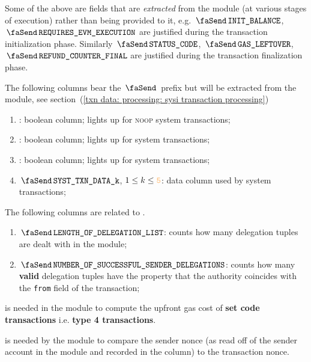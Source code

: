 \saNote{}
Some of the above are fields that are \emph{extracted} from the \hubMod{} module (at various stages of execution) rather than being provided to it, e.g.
$\txInitialBalance$,
$\txRequiresEvmExecution$
are justified during the transaction initialization phase.
Similarly
$\txStatusCode$,
$\txLeftoverGas$,
$\txFinalRefundCounter$
are justified during the transaction finalization phase.

The following columns bear the $\transactionSignifier$ prefix but will be extracted from the
\systTxnDataMod{} module,
see section~(\ref{txn data: processing: sysi transaction processing})
\begin{enumerate}[resume]
	\item
		\godGiven{}
		\txnSystemTransactionNoop:
		boolean column;
		lights up for \textsc{noop} system transactions;
	\item
		\godGiven{}
		\txnSystemTransactionEipBeaconRoot:
		boolean column;
		lights up for \cite{EIP-4788} system transactions;
	\item
		\godGiven{}
		\txnSystemTransactionEipBlockHash:
		boolean column;
		lights up for \cite{EIP-2935} system transactions;
	\item
		\godGiven{}
		$\txnSystemTransactionDataCol{k}$, $1 \leq k \leq \txnDataHubNumberOfDataColumns$:
		data column used by system transactions;
\end{enumerate}
The following columns are related to \cite{EIP-7702}.
\begin{enumerate}[resume]
	\item
		\markAsJustifiedHere{}
		$\txLengthOfDelegationList$:
		counts how many delegation tuples are dealt with in the \hubMod{} module;
	\item
		\markAsJustifiedHere{}
		$\txNumberOfSuccessfulSenderDelegations$:
		counts how many \textbf{valid} delegation tuples  have the property
		that the authority coincides with the \texttt{from} field of the transaction;
\end{enumerate}
\saNote{}
\txLengthOfDelegationList{}
is needed in the \txnDataMod{} module
to compute the upfront gas cost of
\textbf{set code transactions}
i.e. \textbf{type 4 transactions}.

\saNote{}
\txNumberOfSuccessfulSenderDelegations{}
is needed by the \txnDataMod{} module
to compare the sender nonce
(as read off of the sender account in the \hubMod{} module
and recorded in the \txNonce{} column)
to the transaction nonce.
